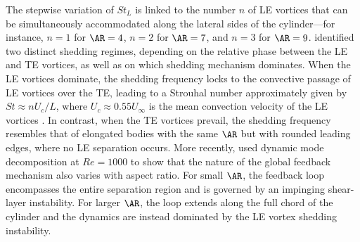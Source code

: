 The stepwise variation of $St_L$ is linked to the number $n$ of LE vortices that can be simultaneously accommodated along the lateral sides of the cylinder---for instance, $n=1$ for $\AR=4$, $n=2$ for $\AR=7$, and $n=3$ for $\AR=9$. \citet{chiarini-quadrio-auteri-2022} identified two distinct shedding regimes, depending on the relative phase between the LE and TE vortices, as well as on which shedding mechanism dominates. When the LE vortices dominate, the shedding frequency locks to the convective passage of LE vortices over the TE, leading to a Strouhal number approximately given by $St \approx n U_c / L$, where $U_c \approx 0.55 U_\infty$ is the mean convection velocity of the LE vortices \citep[see also][]{mills-sheridan-hourigan-2002,tan-thompson-hourigan-2004}. In contrast, when the TE vortices prevail, the shedding frequency resembles that of elongated bodies with the same $\AR$ but with rounded leading edges, where no LE separation occurs.
%
More recently, \citet{zhang-etal-2023} used dynamic mode decomposition at $Re=1000$ to show that the nature of the global feedback mechanism also varies with aspect ratio. For small $\AR$, the feedback loop encompasses the entire separation region and is governed by an impinging shear-layer instability. For larger $\AR$, the loop extends along the full chord of the cylinder and the dynamics are instead dominated by the LE vortex shedding instability.
  
